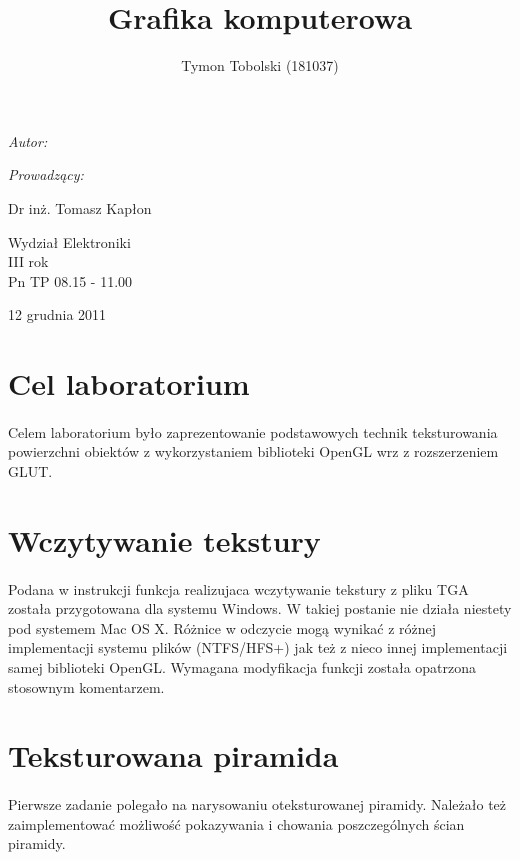 \documentclass[wide,a4paper,titlepage,12pt] {article}
\title{Grafika komputerowa}
\author{Tymon Tobolski (181037)}
\makeatletter
\renewcommand{\maketitle}{
\begin{titlepage}
  \begin{center}
    \vspace*{3cm}
    \LARGE \@title \par
    \vspace{2cm}
    \textit{\small Autor:}\par
    \normalsize \@author\par \normalsize
    \vspace{3cm}
    \textit{\small Prowadzący:}\par
    Dr inż. Tomasz Kapłon \par
    \vspace{2cm}
    Wydział Elektroniki\\ III rok\\ Pn TP 08.15 - 11.00\par
    \vspace{4cm}
    \small 12 grudnia 2011
  \end{center}
\end{titlepage}
}
\makeatother
\begin{document}
\maketitle
  \section{Cel laboratorium}
  \paragraph{}
  Celem laboratorium było zaprezentowanie podstawowych technik teksturowania powierzchni obiektów z wykorzystaniem biblioteki OpenGL wrz z rozszerzeniem GLUT.

  \section{Wczytywanie tekstury}
  \paragraph{}
  Podana w instrukcji funkcja realizujaca wczytywanie tekstury z pliku TGA została przygotowana dla systemu Windows. W takiej postanie nie działa niestety pod systemem Mac OS X. Różnice w odczycie mogą wynikać z różnej implementacji systemu plików (NTFS/HFS+) jak też z nieco innej implementacji samej biblioteki OpenGL. Wymagana modyfikacja funkcji została opatrzona stosownym komentarzem.

  

  \section{Teksturowana piramida}
  \paragraph{}
  Pierwsze zadanie polegało na narysowaniu oteksturowanej piramidy. Należało też zaimplementować możliwość pokazywania i chowania poszczególnych ścian piramidy.

  \paragraph{}
  
\end{document}
